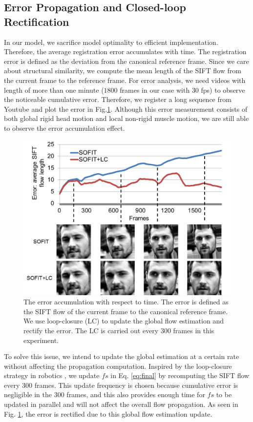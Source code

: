 \documentclass[10pt,journal]{IEEEtran}
\begin{document}
\subsection{\label{sec:details}Error Propagation and Closed-loop Rectification}

In our model, we sacrifice model optimality to efficient implementation. Therefore, the average registration error accumulates with time. The registration error is defined as the deviation from the canonical reference frame. Since we care about structural similarity, we compute the mean length of the SIFT flow from the current frame to the reference frame. For error analysis, we need videos with length of more than one minute ($1800$ frames in our case with $30$ fps) to observe the noticeable cumulative error. Therefore, we register a long sequence from Youtube and plot the error in Fig.\ref{fig_error_prop}. Although this error measurement consists of both global rigid head motion and local non-rigid muscle motion, we are still able to observe the error accumulation effect.

\begin{figure}[htbp]
	\centering
		\includegraphics[width=\columnwidth]{fig/error_prop.png}
	\caption{The error accumulation with respect to time. The error is defined as the SIFT flow of the current frame to the canonical reference frame. We use loop-closure (LC) to update the global flow estimation and rectify the error. The LC is carried out every $300$ frames in this experiment.}
	\label{fig_error_prop}
\end{figure}

To solve this issue, we intend to update the global estimation at a certain rate without affecting the propagation computation. Inspired by the loop-closure strategy in robotics \cite{close_loop_icra_05}, we update $fs$ in Eq. \ref{eq:final} by recomputing the SIFT flow every $300$ frames. This update frequency is chosen because cumulative error is negligible in the $300$ frames, and this also provides enough time for $fs$ to be updated in parallel and will not affect the overall flow propagation. As seen in Fig. \ref{fig_error_prop}, the error is rectified due to this global flow estimation update. 
\end{document}
